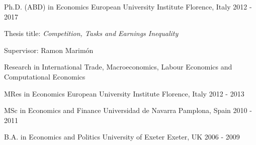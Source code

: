 

\begin{cventries}

  \cventry
    {Ph.D. (ABD) in Economics} %
    {European University Institute} %
    {Florence, Italy} %
    {2012 - 2017} %
    {
        \begin{cvitems} %
            \item {Thesis title: \textit{Competition, Tasks and Earnings Inequality}}
            \item {Supervisor: Ramon Marimón}
            \item {Research in International Trade, Macroeconomics, Labour Economics and Computational Economics}
        \end{cvitems}
    }

\cventry
    {MRes in Economics} %
    {European University Institute} %
    {Florence, Italy} %
    {2012 - 2013} %
    {}

\cventry
    {MSc in Economics and Finance} %
    {Universidad de Navarra} %
    {Pamplona, Spain} %
    {2010 - 2011} %
    {}

\cventry
    {B.A. in Economics and Politics} %
    {University of Exeter} %
    {Exeter, UK} %
    {2006 - 2009} %
    {}

\end{cventries}

